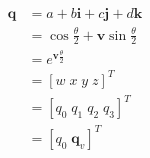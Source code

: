 \documentclass[preview]{standalone}
\begin{document}
\newcommand{\vect}[1] {\mathbf{#1}}
\begin{align*}
\vect{q} &= a + b\vect{i} + c\vect{j} + d\vect{k} \\
         &= \cos{\frac{\theta}{2}} + \vect{v}\sin{\frac{\theta}{2}} \\
         &= e^{\vect{v}\frac{\theta}{2}} \\
         &= \left[w \; x \; y \; z \right]^T \\
         &= \left[q_0 \; q_1 \; q_2 \; q_3 \right]^T \\
         &= \left[q_0 \; \vect{q}_v \right]^T
\end{align*}
\end{document}
